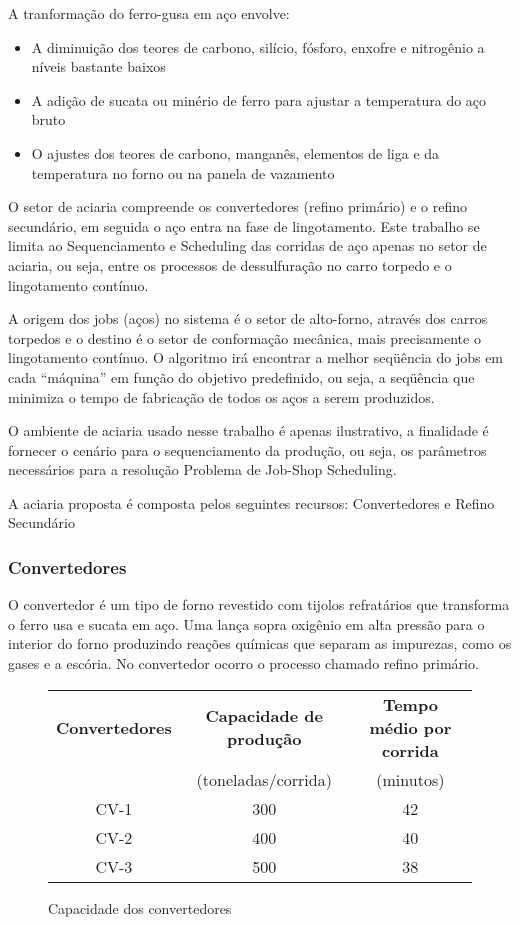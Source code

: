 A tranformação do ferro-gusa em aço envolve:
\begin{itemize}
\item A diminuição dos teores de carbono, silício, fósforo, enxofre e nitrogênio a níveis bastante baixos
\item A adição de sucata ou minério de ferro para ajustar a temperatura do aço bruto
\item O ajustes dos teores de carbono, manganês, elementos de liga e da temperatura no forno ou na panela de vazamento
\end{itemize}

O setor de aciaria compreende os convertedores (refino primário) e o refino secundário, em seguida o aço entra na fase de lingotamento. Este trabalho se limita ao Sequenciamento e Scheduling das corridas de aço apenas no setor de aciaria, ou seja, entre os processos de dessulfuração no carro torpedo e o lingotamento contínuo.

A origem dos jobs (aços) no sistema é o setor de alto-forno, através dos carros torpedos e o destino é o setor de conformação mecânica, mais precisamente o lingotamento contínuo. O algoritmo irá encontrar a melhor seqüência do jobs em cada “máquina” em função do objetivo predefinido, ou seja, a seqüência que minimiza o tempo de fabricação de
todos os aços a serem produzidos.

O ambiente de aciaria usado nesse trabalho é apenas ilustrativo, a finalidade é fornecer o cenário para o sequenciamento da produção, ou seja, os parâmetros necessários para a resolução Problema de Job-Shop Scheduling.

A aciaria proposta é composta pelos seguintes recursos: Convertedores e Refino Secundário

\subsubsection{Convertedores}
O convertedor é um tipo de forno revestido com tijolos refratários que transforma o ferro usa e sucata em aço. Uma lança sopra oxigênio em alta pressão para o interior do forno produzindo reações químicas que separam as impurezas, como os gases e a escória. No convertedor ocorro o processo chamado refino primário.\cite{WIKI}

\begin{figure}[H]
\begin{center}
  \begin{tabular}{|c|c|c|}
    \hline
    {\bf Convertedores} & {\bf Capacidade de produção} & {\bf Tempo médio por corrida} \\
    $\quad$ & (toneladas/corrida)        &    (minutos) \\ \hline
    CV-1 & 300 & 42 \\ \hline
    CV-2 & 400 & 40 \\ \hline
    CV-3 & 500 & 38 \\
    \hline
  \end{tabular}
\end{center}
\caption{Capacidade dos convertedores}
\end{figure}

